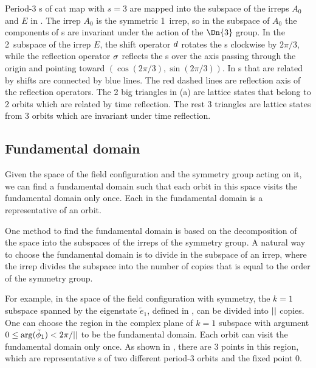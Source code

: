 Period-3 {\lattstate}s of cat map with $s=3$ are mapped into the subspace
of the irreps $A_0$ and $E$ in .
The irrep $A_0$ is the symmetric 1\dmn\ irrep, so in the subspace of $A_0$ the components
of {\lattstate}s are invariant under the action of the $\Dn{3}$ group.
In the 2\dmn\ subspace of the irrep $E$, the shift operator $d$ rotates the
{\lattstate}s clockwise by $2\pi/3$, while the reflection operator $\sigma$ reflects the {\lattstate}s
over the axis passing through the origin and pointing toward $(\cos(2\pi/3),\sin(2\pi/3))$.
In 
{\lattstate}s that are related by shifts are connected by blue lines.
The red dashed lines are reflection axis of the reflection operators.
The 2 big triangles in  (a) are lattice states
that belong to 2 orbits which are related by time reflection. The rest 3 triangles
are lattice states from 3 orbits which are invariant under time reflection.

\subsection{Fundamental domain} %

Given the space of the field configuration and the symmetry group acting on it,
we can find a fundamental domain such that each orbit in this space
visits the fundamental domain only once.
Each {\lattstate} in the fundamental domain is a representative {\lattstate} of an
orbit.

One method to find the fundamental domain is based on the decomposition
of the space into the subspaces of the irreps of the symmetry group.
A natural way to choose the fundamental domain is to divide in the
subspace of an irrep, where the irrep divides the subspace into the number
of copies that is equal to the order of the symmetry group.

For example, in the space of the field configuration with \Cn{\cl{}} symmetry, the $k=1$ subspace
spanned by the eigenstate $\tilde{e}_1$, defined in , can be divided
into ${||}$ copies. One can choose the region in the complex plane of $k=1$ subspace
with argument $0\leq\arg(\tilde{\phi}_{1})<2\pi/{||}$ to be the fundamental domain.
Each orbit can visit the fundamental domain only once. As shown in ,
there are 3 points in this region, which are representative {\lattstate}s of two different
period-3 orbits and the fixed point $0$.

